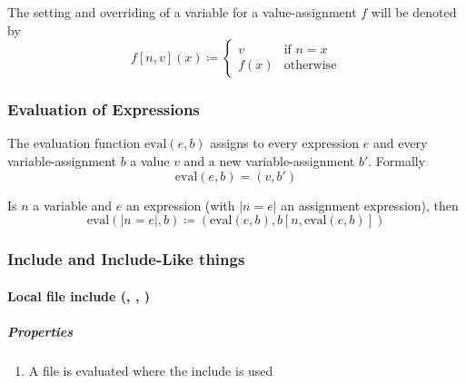 The setting and overriding of a variable for a value-assignment $f$ will be denoted by
\begin{equation*}
	f[n, v](x) \coloneq
	\begin{cases}
		v & \text{if } n = x \\
		f(x) & \text{otherwise}
	\end{cases}
\end{equation*}

\subsubsection{Evaluation of Expressions}

\newcommand{\evaluate}{\text{eval}}

The evaluation function $\evaluate(e, b)$ assigns to every expression $e$ and every variable-assignment $b$ a value $v$ and a new variable-assignment $b'$. Formally
\begin{equation*}
	\evaluate(e,b) = (v,b')
\end{equation*}

\medskip

Is $n$ a variable and $e$ an expression (with $|n = e|$ an assignment expression), then
\begin{equation*}
	\evaluate(|n=e|, b) \coloneq (\evaluate(e, b), b[n, \evaluate(e,b)])
\end{equation*}



\subsubsection{Include and Include-Like things}

\paragraph{Local file include (\julialang, \clang, \cpplang)}

\subparagraph{Properties}

\begin{enumerate}
	\item A file is evaluated where the include is used
\end{enumerate}

